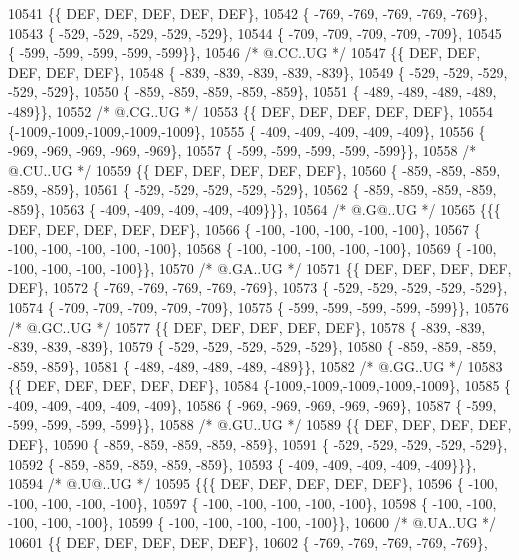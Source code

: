 \begin{DoxyCode}
10541 \{\{  DEF,  DEF,  DEF,  DEF,  DEF\},
10542 \{ -769, -769, -769, -769, -769\},
10543 \{ -529, -529, -529, -529, -529\},
10544 \{ -709, -709, -709, -709, -709\},
10545 \{ -599, -599, -599, -599, -599\}\},
10546 \textcolor{comment}{/*  @.CC..UG */}
10547 \{\{  DEF,  DEF,  DEF,  DEF,  DEF\},
10548 \{ -839, -839, -839, -839, -839\},
10549 \{ -529, -529, -529, -529, -529\},
10550 \{ -859, -859, -859, -859, -859\},
10551 \{ -489, -489, -489, -489, -489\}\},
10552 \textcolor{comment}{/*  @.CG..UG */}
10553 \{\{  DEF,  DEF,  DEF,  DEF,  DEF\},
10554 \{-1009,-1009,-1009,-1009,-1009\},
10555 \{ -409, -409, -409, -409, -409\},
10556 \{ -969, -969, -969, -969, -969\},
10557 \{ -599, -599, -599, -599, -599\}\},
10558 \textcolor{comment}{/*  @.CU..UG */}
10559 \{\{  DEF,  DEF,  DEF,  DEF,  DEF\},
10560 \{ -859, -859, -859, -859, -859\},
10561 \{ -529, -529, -529, -529, -529\},
10562 \{ -859, -859, -859, -859, -859\},
10563 \{ -409, -409, -409, -409, -409\}\}\},
10564 \textcolor{comment}{/*  @.G@..UG */}
10565 \{\{\{  DEF,  DEF,  DEF,  DEF,  DEF\},
10566 \{ -100, -100, -100, -100, -100\},
10567 \{ -100, -100, -100, -100, -100\},
10568 \{ -100, -100, -100, -100, -100\},
10569 \{ -100, -100, -100, -100, -100\}\},
10570 \textcolor{comment}{/*  @.GA..UG */}
10571 \{\{  DEF,  DEF,  DEF,  DEF,  DEF\},
10572 \{ -769, -769, -769, -769, -769\},
10573 \{ -529, -529, -529, -529, -529\},
10574 \{ -709, -709, -709, -709, -709\},
10575 \{ -599, -599, -599, -599, -599\}\},
10576 \textcolor{comment}{/*  @.GC..UG */}
10577 \{\{  DEF,  DEF,  DEF,  DEF,  DEF\},
10578 \{ -839, -839, -839, -839, -839\},
10579 \{ -529, -529, -529, -529, -529\},
10580 \{ -859, -859, -859, -859, -859\},
10581 \{ -489, -489, -489, -489, -489\}\},
10582 \textcolor{comment}{/*  @.GG..UG */}
10583 \{\{  DEF,  DEF,  DEF,  DEF,  DEF\},
10584 \{-1009,-1009,-1009,-1009,-1009\},
10585 \{ -409, -409, -409, -409, -409\},
10586 \{ -969, -969, -969, -969, -969\},
10587 \{ -599, -599, -599, -599, -599\}\},
10588 \textcolor{comment}{/*  @.GU..UG */}
10589 \{\{  DEF,  DEF,  DEF,  DEF,  DEF\},
10590 \{ -859, -859, -859, -859, -859\},
10591 \{ -529, -529, -529, -529, -529\},
10592 \{ -859, -859, -859, -859, -859\},
10593 \{ -409, -409, -409, -409, -409\}\}\},
10594 \textcolor{comment}{/*  @.U@..UG */}
10595 \{\{\{  DEF,  DEF,  DEF,  DEF,  DEF\},
10596 \{ -100, -100, -100, -100, -100\},
10597 \{ -100, -100, -100, -100, -100\},
10598 \{ -100, -100, -100, -100, -100\},
10599 \{ -100, -100, -100, -100, -100\}\},
10600 \textcolor{comment}{/*  @.UA..UG */}
10601 \{\{  DEF,  DEF,  DEF,  DEF,  DEF\},
10602 \{ -769, -769, -769, -769, -769\},

\end{DoxyCode}
